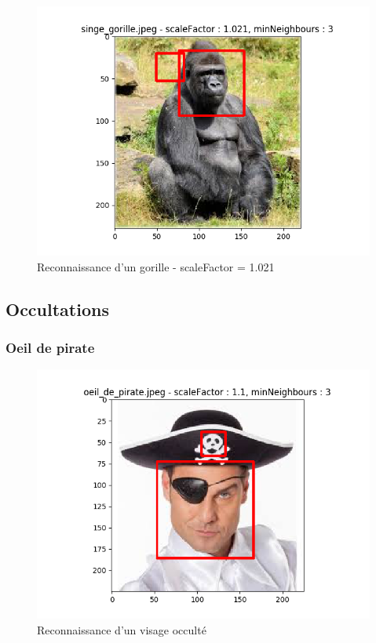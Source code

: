 \documentclass[a4paper,11pt]{article}
\begin{document}
	\begin{figure}[H]
	    \begin{center}
		\includegraphics[scale = 0.6]{images/singe_gorille_1,021_3.png}
		\caption{Reconnaissance d'un gorille - scaleFactor = 1.021}
		\label{fig:singe2}
	    \end{center}
	\end{figure}

    \subsection{Occultations}

	\subsubsection{Oeil de pirate}

	    \begin{figure}[H]
	        \begin{center}
	    	\includegraphics[scale = 0.6]{images/oeil_de_pirate_1,1_3.png}
	    	\caption{Reconnaissance d'un visage occulté}
	    	\label{fig:pirate}
	        \end{center}
	    \end{figure}
\end{document}
